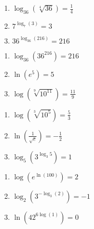 \documentclass{ximera}
\begin{document}
\begin{multicols}{3}
\begin{enumerate}
\setcounter{enumi}{\value{HW}}


\item $\log_{36} \left(\sqrt[4]{36}\right) = \frac{1}{4}$
\item $7^{\log_{7} (3)} = 3$
\item  $36^{\log_{36}(216)} = 216$

\setcounter{HW}{\value{enumi}}
\end{enumerate}
\end{multicols}

\begin{multicols}{3}
\begin{enumerate}
\setcounter{enumi}{\value{HW}}


\item  $\log_{36} \left(36^{216}\right) = 216$
\item $\ln(e^{5}) = 5$
\item $\log \left(\sqrt[9]{10^{11}}\right) = \frac{11}{9}$

\setcounter{HW}{\value{enumi}}
\end{enumerate}
\end{multicols}

\begin{multicols}{3}
\begin{enumerate}
\setcounter{enumi}{\value{HW}}


\item  $\log\left( \sqrt[3]{10^5} \right) = \frac{5}{3}$
\item  $\ln \left( \frac{1}{\sqrt{e}}\right) = -\frac{1}{2} $
\item $\log_{5} \left(3^{\log_{3} 5}\right) = 1$

\setcounter{HW}{\value{enumi}}
\end{enumerate}
\end{multicols}

\begin{multicols}{3}
\begin{enumerate}
\setcounter{enumi}{\value{HW}}


\item $\log\left(e^{\ln(100)}\right) = 2$
\item $\log_{2}\left(3^{-\log_{3}(2)}\right) = -1$
\item $\ln\left(42^{6\log(1)}\right) = 0$

\setcounter{HW}{\value{enumi}}
\end{enumerate}
\end{multicols}
\end{document}
